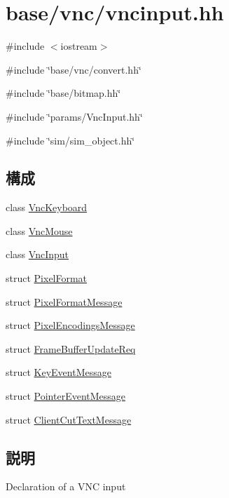 \hypertarget{vncinput_8hh}{
\section{base/vnc/vncinput.hh}
\label{vncinput_8hh}
}
{\ttfamily \#include $<$iostream$>$}\par
{\ttfamily \#include \char`\"{}base/vnc/convert.hh\char`\"{}}\par
{\ttfamily \#include \char`\"{}base/bitmap.hh\char`\"{}}\par
{\ttfamily \#include \char`\"{}params/VncInput.hh\char`\"{}}\par
{\ttfamily \#include \char`\"{}sim/sim\_\-object.hh\char`\"{}}\par
\subsection*{構成}
\begin{DoxyCompactItemize}
\item 
class \hyperlink{classVncKeyboard}{VncKeyboard}
\item 
class \hyperlink{classVncMouse}{VncMouse}
\item 
class \hyperlink{classVncInput}{VncInput}
\item 
struct \hyperlink{structVncInput_1_1PixelFormat}{PixelFormat}
\item 
struct \hyperlink{structVncInput_1_1PixelFormatMessage}{PixelFormatMessage}
\item 
struct \hyperlink{structVncInput_1_1PixelEncodingsMessage}{PixelEncodingsMessage}
\item 
struct \hyperlink{structVncInput_1_1FrameBufferUpdateReq}{FrameBufferUpdateReq}
\item 
struct \hyperlink{structVncInput_1_1KeyEventMessage}{KeyEventMessage}
\item 
struct \hyperlink{structVncInput_1_1PointerEventMessage}{PointerEventMessage}
\item 
struct \hyperlink{structVncInput_1_1ClientCutTextMessage}{ClientCutTextMessage}
\end{DoxyCompactItemize}


\subsection{説明}
Declaration of a VNC input 